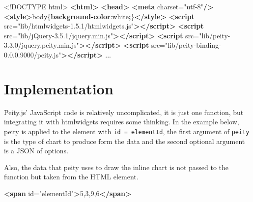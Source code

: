\documentclass[
  10pt,
]{krantz}
\makeatletter
\newenvironment{Shaded}{\begin{snugshade}}{\end{snugshade}}
\newcommand{\AttributeTok}[1]{\textcolor[rgb]{0.61,0.61,0.61}{#1}}
\newcommand{\ConstantTok}[1]{\textcolor[rgb]{0,0,0}{#1}}
\newcommand{\DataTypeTok}[1]{\textcolor[rgb]{0.27,0.27,0.27}{#1}}
\newcommand{\KeywordTok}[1]{\textcolor[rgb]{0.27,0.27,0.27}{\textbf{#1}}}
\newcommand{\NormalTok}[1]{#1}
\newcommand{\OperatorTok}[1]{\textcolor[rgb]{0.43,0.43,0.43}{\textbf{#1}}}
\newcommand{\OtherTok}[1]{\textcolor[rgb]{0.37,0.37,0.37}{#1}}
\newcommand{\StringTok}[1]{\textcolor[rgb]{0.5,0.5,0.5}{#1}}
\newenvironment{kframe}{%
\medskip{}
\setlength{\fboxsep}{.8em}
 \def\at@end@of@kframe{}%
 \ifinner\ifhmode%
  \def\at@end@of@kframe{\end{minipage}}%
  \begin{minipage}{\columnwidth}%
 \fi\fi%
 \def\FrameCommand##1{\hskip\@totalleftmargin \hskip-\fboxsep
 \colorbox{shadecolor}{##1}\hskip-\fboxsep
     \hskip-\linewidth \hskip-\@totalleftmargin \hskip\columnwidth}%
 \MakeFramed {\advance\hsize-\width
   \@totalleftmargin\z@ \linewidth\hsize
   \@setminipage}}%
 {\par\unskip\endMakeFramed%
 \at@end@of@kframe}
\renewenvironment{Shaded}{\begin{kframe}}{\end{kframe}}
\makeatother
\begin{document}
\begin{Shaded}
\begin{Highlighting}[]
\DataTypeTok{<!DOCTYPE }\NormalTok{html}\DataTypeTok{>}
\KeywordTok{<html>}
\KeywordTok{<head>}
\KeywordTok{<meta}\OtherTok{ charset=}\StringTok{"utf{-}8"}\KeywordTok{/>}
\KeywordTok{<style>}\NormalTok{body\{}\KeywordTok{background{-}color}\NormalTok{:}\ConstantTok{white}\OperatorTok{;}\NormalTok{\}}\KeywordTok{</style>}
\KeywordTok{<script}\OtherTok{ src=}\StringTok{"lib/htmlwidgets{-}1.5.1/htmlwidgets.js"}\KeywordTok{></script>}
\KeywordTok{<script}\OtherTok{ src=}\StringTok{"lib/jQuery{-}3.5.1/jquery.min.js"}\KeywordTok{></script>}
\KeywordTok{<script}\OtherTok{ src=}\StringTok{"lib/peity{-}3.3.0/jquery.peity.min.js"}\KeywordTok{></script>}
\KeywordTok{<script}\OtherTok{ src=}\StringTok{"lib/peity{-}binding{-}0.0.0.9000/peity.js"}\KeywordTok{></script>}
\NormalTok{...}
\end{Highlighting}
\end{Shaded}

\hypertarget{widgets-realistic-implementation}{%
\section{Implementation}\label{widgets-realistic-implementation}}

Peity.js' JavaScript code is relatively uncomplicated, it is just one function, but integrating it with htmlwidgets requires some thinking. In the example below, peity is applied to the element with \texttt{id\ =\ \textquotesingle{}elementId\textquotesingle{}}, the first argument of \texttt{peity} is the type of chart to produce form the data and the second optional argument is a JSON of options.

\begin{Shaded}
\end{Shaded}

Also, the data that peity uses to draw the inline chart is not passed to the function but taken from the HTML element.

\begin{Shaded}
\begin{Highlighting}[]
\KeywordTok{<span}\OtherTok{ id=}\StringTok{"elementId"}\KeywordTok{>}\NormalTok{5,3,9,6}\KeywordTok{</span>}
\end{Highlighting}
\end{Shaded}
\end{document}
